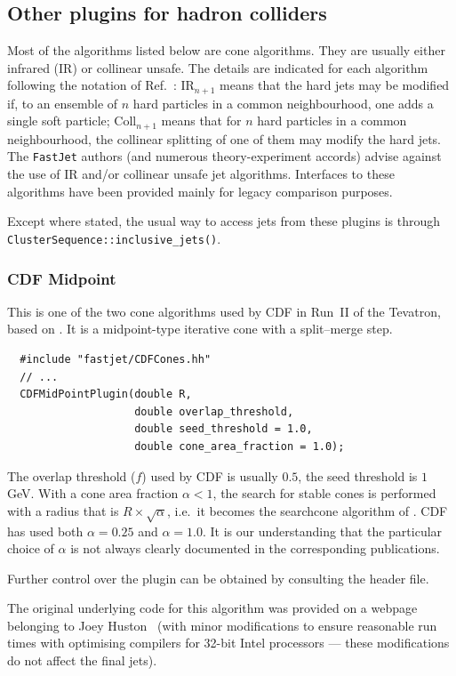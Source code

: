 \documentclass[12pt,a4]{article}
\newcommand{\fastjet}{\texttt{FastJet}\xspace}
\newcommand{\ttt}[1]{{\small\texttt{#1}}}
\begin{document}
\subsection{Other plugins for hadron colliders }
\label{sec:other-pp-plugins}

Most of the algorithms listed below are cone algorithms. 
%
They are usually either infrared (IR) or collinear unsafe.
%
The details are indicated for each algorithm following the
notation of Ref.~\cite{Salam:2009jx}: IR$_{n+1}$ means 
that the hard jets may be modified if, to an ensemble of $n$ hard
particles in a common neighbourhood, one adds a single soft particle;
Coll$_{n+1}$ means that for $n$ hard particles in a common
neighbourhood, the collinear splitting of one of them may modify the
hard jets.
%
The \fastjet authors (and numerous theory-experiment accords) advise
against the use of IR and/or collinear unsafe jet algorithms.  Interfaces to
these algorithms have been provided mainly for legacy comparison
purposes.

Except where stated, the usual way to access jets from these plugins
is through \ttt{ClusterSequence::inclusive\_jets()}.



\subsubsection{CDF Midpoint} 
%
This is one of the two cone algorithms used by CDF in Run~II of the Tevatron, based
on \cite{RunII-jet-physics}. It is a midpoint-type iterative cone with
a split--merge step.
%
\begin{lstlisting}
  #include "fastjet/CDFCones.hh"
  // ...
  CDFMidPointPlugin(double R, 
                    double overlap_threshold,
                    double seed_threshold = 1.0, 
                    double cone_area_fraction = 1.0);
\end{lstlisting}
The overlap threshold ($f$) used by CDF is usually $0.5$, the seed
threshold is $1$\,GeV. 
%
With a cone area fraction $\alpha < 1$, the search for stable
cones is performed with a radius that is $R \times
\sqrt{\alpha}$, i.e.\ it becomes the searchcone
algorithm of \cite{EHT}.
%
CDF has used both $\alpha = 0.25$ and $\alpha = 1.0$.
%
It is our understanding that the particular choice of $\alpha$ is not
always clearly documented in the corresponding publications.

Further control over the plugin can be obtained by consulting the
header file.

The original underlying code for this algorithm was provided on a
webpage belonging to Joey Huston~\cite{CDFCones} (with minor
modifications to ensure reasonable run times with optimising compilers
for 32-bit Intel processors --- these modifications do not affect the
final jets).
\end{document}
